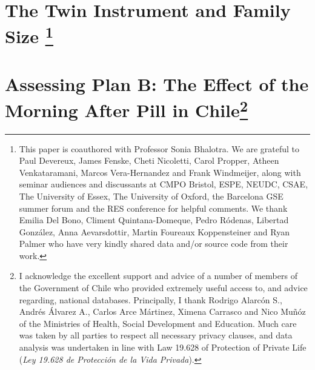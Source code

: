 \documentclass{report}[12pt]
\let\stdsection\thesection
\let\oldchapter\chapter
\renewcommand{\chapter}{\let\thesection\stdsection\oldchapter}
\begin{document}
\newpage
\begin{spacing}{1.4}
\setlength\parindent{0.25in}
\setlength\parskip{0.25in}




\renewcommand*{\thefootnote}{\fnsymbol{footnote}}

\chapter[The Twin Instrument and Family Size]%
{The Twin Instrument and Family Size%
\footnote{This paper is coauthored with Professor Sonia Bhalotra. We are 
grateful to Paul Devereux, James Fenske, Cheti Nicoletti, Carol Propper, Atheen 
Venkataramani, Marcos Vera-Hernandez and Frank Windmeijer, along with seminar 
audiences and discussants at CMPO Bristol, ESPE, NEUDC, CSAE, The University of 
Essex, The University of Oxford, the Barcelona GSE summer forum and the RES 
conference for helpful comments.  We thank Emilia Del Bono, Climent 
Quintana-Domeque, Pedro R\'odenas, Libertad Gonz\'alez, Anna Aevarsdottir, 
Martin Foureaux Koppensteiner and Ryan Palmer who have very kindly shared data 
and/or source code from their work.}}
\label{chap:twins}
\renewcommand*{\thefootnote}{\arabic{footnote}}




\setlength\parindent{0.25in}
\setlength\parskip{0.25in}
\renewcommand*{\thefootnote}{\fnsymbol{footnote}}

\chapter[Assessing Plan B: The Effect of the Morning After Pill in Chile]{Assessing Plan B: The Effect of the Morning After Pill in Chile\footnote{I acknowledge
the excellent support and advice of a number of members of the Government of Chile 
who provided extremely useful access to, and advice regarding, national databases.  
Principally, I thank Rodrigo Alarc\'on S., Andr\'es \'Alvarez A., Carlos Arce 
M\'artinez, Ximena Carrasco and Nico Mu\~n\'oz of the Ministries of Health, Social 
Development and Education.  Much care was taken by all parties to respect all 
necessary privacy clauses, and data analysis was undertaken in line with Law 
19.628 of Protection of Private Life 
(\emph{Ley 19.628 de Protecci\'on de la Vida Privada}).}}
\label{chap:pill}
\renewcommand*{\thefootnote}{\arabic{footnote}}


\end{spacing}
\end{document}

